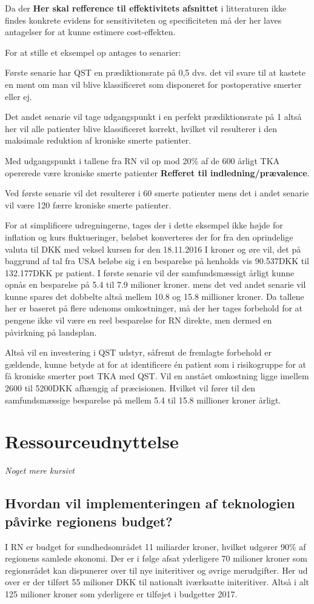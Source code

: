 Da der \textbf{Her skal refference til effektivitets afsnittet} i litteraturen ikke findes konkrete evidens for sensitiviteten og specificiteten må der her laves antagelser for at kunne estimere cost-effekten. 

For at stille et eksempel op antages to senarier:

Første senarie har QST en prædiktionsrate på 0,5 dvs. det vil svare til at kastete en mønt om man vil blive klassificeret som disponeret for postoperative smerter eller ej.

Det andet senarie vil tage udgangspunkt i en perfekt prædiktionsrate på 1 altså her vil alle patienter blive klassificeret korrekt, hvilket vil resulterer i den maksimale  reduktion af kroniske smerte patienter.

Med udgangspunkt i tallene fra RN vil op mod 20\% af de 600 årligt TKA opererede være kroniske smerte patienter \textbf{Refferet til indledning/prævalence}.

Ved første senarie vil det resulterer i 60 smerte patienter mens det i andet senarie vil være 120 færre kroniske smerte patienter. 

For at simplificere udregningerne, tages der i dette eksempel ikke højde for inflation og kurs fluktueringer, beløbet konverteres der for fra den oprindelige valuta til DKK med veksel kursen for den 18.11.2016
I kroner og øre vil, det på baggrund af tal fra USA beløbe sig i en besparelse på henholds vis 90.537DKK til 132.177DKK pr patient. I første senarie vil der samfundsmæssigt årligt kunne opnås en besparelse på 5.4 til 7.9 milioner kroner. mens det ved andet senarie vil kunne spares det dobbelte altså mellem 10.8 og 15.8 millioner kroner. Da tallene her er baseret på flere udenoms omkostninger, må der her tages forbehold for at pengene ikke vil være en reel besparelse for RN direkte, men dermed en påvirkning på landsplan.

Altså vil en investering i QST udstyr, såfremt de fremlagte forbehold er gældende, kunne betyde at for at identificere én patient som i risikogruppe for at få kroniske smerter post TKA med QST. Vil en anstået omkostning ligge imellem 2600 til 5200DKK afhængig af præcisionen. Hvilket vil fører til den samfundsmæssige besparelse på mellem 5.4 til 15.8 millioner kroner årligt.
\section{Ressourceudnyttelse}
\textit{Noget mere kursivt}
\subsection{Hvordan vil implementeringen af teknologien påvirke regionens budget?}
I RN er budget for sundhedsområdet 11 miliarder kroner, hvilket udgører 90\% af regionens samlede økonomi. \citep{RnBudget17}  Der er i følge  afsat yderligere 70 milioner kroner som regionsrådet kan dispunerer over til nye initeritiver og øvrige merudgifter. Her ud over er der tilført 55 milioner DKK til nationalt iværksatte initeritiver. Altså i alt 125 milioner kroner som yderligere er tilføjet i budgetter 2017.

